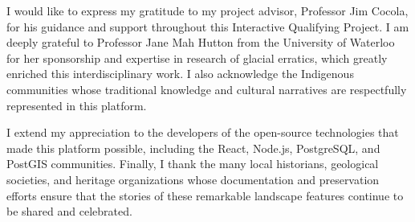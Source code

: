 \documentclass[
11pt, %
english, %
singlespacing, %
headsepline, %
]{MastersDoctoralThesis} %
\begin{document}
\begin{acknowledgements}
\addchaptertocentry{\acknowledgementname} %

I would like to express my gratitude to my project advisor, Professor Jim Cocola, for his guidance and support throughout this Interactive Qualifying Project. I am deeply grateful to Professor Jane Mah Hutton from the University of Waterloo for her sponsorship and expertise in research of glacial erratics, which greatly enriched this interdisciplinary work. I also acknowledge the Indigenous communities whose traditional knowledge and cultural narratives are respectfully represented in this platform.

I extend my appreciation to the developers of the open-source technologies that made this platform possible, including the React, Node.js, PostgreSQL, and PostGIS communities. Finally, I thank the many local historians, geological societies, and heritage organizations whose documentation and preservation efforts ensure that the stories of these remarkable landscape features continue to be shared and celebrated.

\end{acknowledgements}

\end{document}
